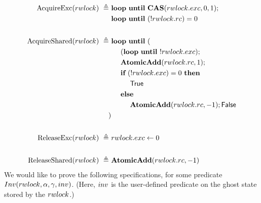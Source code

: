 \documentclass{article}
\newcommand{\true}{\textsf{True}}
\newcommand{\false}{\textsf{False}}
\renewcommand{\eqdef}{\triangleq}
\begin{document}
\begin{align*}
  \AcquireExc(\rwlock) ~\eqdef~
      & \langloop~\until~\CAS(\rwlock.\exc,0,1);\\
      & \langloop~\until~(!\rwlock.\rc) = 0\\
      \\
  \AcquireShared(\rwlock) ~\eqdef~
      & \langloop~\until~(\\
        & ~~~~ (\langloop~\until~!\rwlock.\exc);\\
        & ~~~~ \AtomicAdd(\rwlock.\rc, 1);\\
        & ~~~~ \langif~ (!\rwlock.\exc) = 0 ~\langthen\\
        & ~~~~~~~~ \true\\
        & ~~~~ \langelse\\
        & ~~~~~~~~ \AtomicAdd(\rwlock.\rc, -1); \false\\
      )\\
      \\
  \ReleaseExc(\rwlock) ~\eqdef~
      & \rwlock.\exc \langassign 0\\
      \\
  \ReleaseShared(\rwlock) ~\eqdef~
      & \AtomicAdd(\rwlock.\rc, -1)
\end{align*}
We would like to prove the following specifications, for some predicate $Inv(rwlock,\alpha,\gamma,inv)$. (Here, $inv$ is the user-defined predicate on the ghost state stored by the $rwlock$.)
\end{document}
